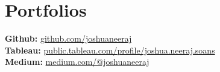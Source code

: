 \documentclass[letterpaper,11pt]{article}
\begin{document}
\section{Portfolios}
 \begin{itemize}[leftmargin=0.15in, label={}]
    \small{\item{
     \textbf{Github:} \href{https://github.com/joshuaneeraj}{github.com/joshuaneeraj} \\
     \textbf{Tableau:} \href{https://public.tableau.com/profile/joshua.neeraj.soans#!/}{public.tableau.com/profile/joshua.neeraj.soans} \\
     \textbf{Medium:} \href{https://medium.com/@joshuaneeraj}{medium.com/@joshuaneeraj}
    }}
 \end{itemize}
\end{document}

